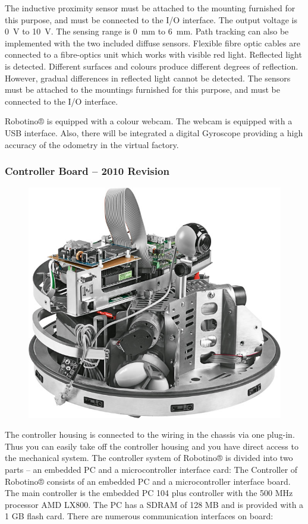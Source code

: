 \documentclass[12pt,twoside]{article}
\begin{document}
\begin{appendix}
The inductive proximity sensor must be attached to the mounting
furnished for this purpose, and must be connected to the I/O
interface.  The output voltage is \SI{0}{\volt} to \SI{10}{\volt}. The
sensing range is \SI{0}{\milli\metre} to \SI{6}{\milli\metre}. Path
tracking can also be implemented with the two included diffuse
sensors.  Flexible fibre optic cables are connected to a fibre-optics
unit which works with visible red light. Reflected light is
detected. Different surfaces and colours produce different degrees of
reflection. However, gradual differences in reflected light cannot be
detected. The sensors must be attached to the mountings furnished for
this purpose, and must be connected to the I/O interface.

Robotino® is equipped with a colour webcam. The webcam is equipped with
a USB interface. Also, there will be integrated a digital Gyroscope
providing a high accuracy of the odometry in the virtual factory.

\subsubsection{Controller Board – 2010 Revision}

\begin{figure}[h]
\centering
\includegraphics[width=.5\textwidth]{RobotinoOpen.jpg}
\label{apx:fig:robotinoopen}
\end{figure}


The controller housing is connected to the wiring in the chassis via
one plug-in. Thus you can easily take off the controller housing and
you have direct access to the mechanical system. The controller system
of Robotino® is divided into two parts – an embedded PC and a
microcontroller interface card: The Controller of Robotino® consists of
an embedded PC and a microcontroller interface board. The main
controller is the embedded PC 104 plus controller with the 500 MHz
processor AMD LX800. The PC has a SDRAM of 128 MB and is provided with
a 1 GB flash card. There are numerous communication interfaces on
board:


\end{appendix}
\end{document}
